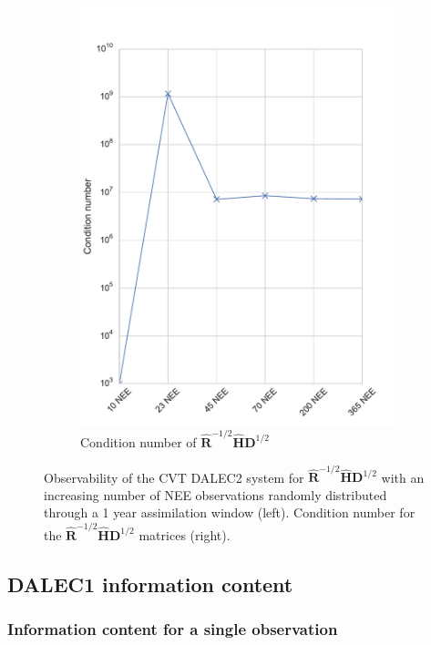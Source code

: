 \documentclass[11pt]{article}
\begin{document}
\begin{figure}[ht]
\begin{subfigure}[b]{0.4\textwidth}
        \includegraphics[width=\textwidth]{dalec2_obsrankcondcvtwind.pdf}
        \caption{Condition number of $\hat{\textbf{R}}^{-1/2}\hat{\textbf{H}}\textbf{D}^{1/2}$}
        \label{fig:D2_observabilitycondcvtwind}
    \end{subfigure}
    \caption{Observability of the CVT DALEC2 system for $\hat{\textbf{R}}^{-1/2}\hat{\textbf{H}}\textbf{D}^{1/2}$ with an increasing number of NEE observations randomly distributed through a 1 year assimilation window (left). Condition number for the $\hat{\textbf{R}}^{-1/2}\hat{\textbf{H}}\textbf{D}^{1/2}$ matrices (right).}
    \label{fig:D2_cvtobservabilitywind}
\end{figure}


\subsection{DALEC1 information content} \label{sec:D1_IC} %
\subsubsection{Information content for a single observation} \label{sec:info_con_single_time}
\end{document}
